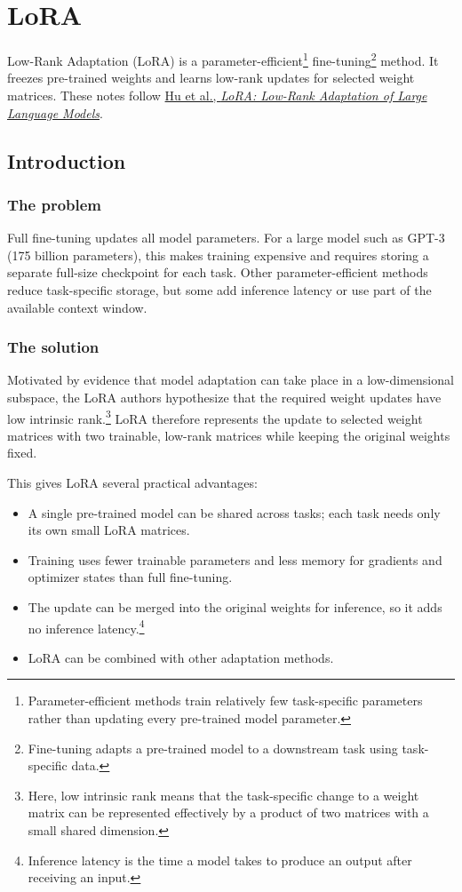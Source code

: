 \section{LoRA}

Low-Rank Adaptation (LoRA) is a parameter-efficient\footnote{Parameter-efficient methods train relatively few task-specific parameters rather than updating every pre-trained model parameter.} fine-tuning\footnote{Fine-tuning adapts a pre-trained model to a downstream task using task-specific data.} method. It freezes pre-trained weights and learns low-rank updates for selected weight matrices. These notes follow \href{https://arxiv.org/abs/2106.09685}{Hu et al., \emph{LoRA: Low-Rank Adaptation of Large Language Models}}.

\subsection{Introduction}

\subsubsection{The problem}

Full fine-tuning updates all model parameters. For a large model such as GPT-3 (175 billion parameters), this makes training expensive and requires storing a separate full-size checkpoint for each task. Other parameter-efficient methods reduce task-specific storage, but some add inference latency or use part of the available context window.

\subsubsection{The solution}

Motivated by evidence that model adaptation can take place in a low-dimensional subspace, the LoRA authors hypothesize that the required weight updates have low intrinsic rank.\footnote{Here, low intrinsic rank means that the task-specific change to a weight matrix can be represented effectively by a product of two matrices with a small shared dimension.} LoRA therefore represents the update to selected weight matrices with two trainable, low-rank matrices while keeping the original weights fixed.

This gives LoRA several practical advantages:
\begin{itemize}
    \item A single pre-trained model can be shared across tasks; each task needs only its own small LoRA matrices.
    \item Training uses fewer trainable parameters and less memory for gradients and optimizer states than full fine-tuning.
    \item The update can be merged into the original weights for inference, so it adds no inference latency.\footnote{Inference latency is the time a model takes to produce an output after receiving an input.}
    \item LoRA can be combined with other adaptation methods.
\end{itemize}

